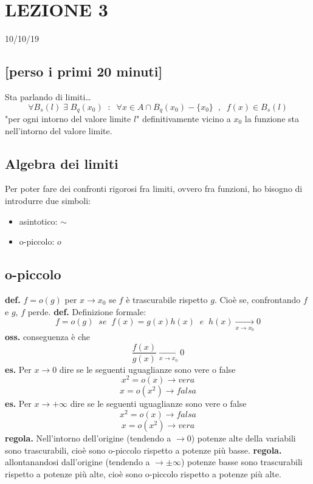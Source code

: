 \section*{LEZIONE 3}
10/10/19
\subsection*{[perso i primi 20 minuti]}
Sta parlando di limiti\dots
\newline
\[
    \forall B_s(l) \;\exists\; B_q(x_0) \;\;:\;\; \forall x\in A \cap B_q(x_0)-\{x_0\} \;\;,\;\;f(x) \in B_s(l)
\]
"per ogni intorno del valore limite $l$" definitivamente vicino a $x_0$ la funzione sta nell'intorno del valore limite.
\subsection*{Algebra dei limiti}
Per poter fare dei confronti rigorosi fra limiti, ovvero fra funzioni, ho bisogno di introdurre due simboli:
\begin{itemize}
    \item asintotico: $\sim$
    \item o-piccolo: $o$
\end{itemize}
\subsection*{o-piccolo}
\textbf{def.} $f = o(g)$ per $x \rightarrow x_0$ se $f$ è trascurabile rispetto $g$. Cioè se, confrontando $f$ e $g$, $f$ perde.
\newline
\newline
\textbf{def.} Definizione formale:
\[
    f = o(g) \;\; se \;\; f(x) = g(x)h(x) \;\; e \;\; h(x) \xrightarrow[x\rightarrow x_0] \; 0
\]
\textbf{oss.} conseguenza è che
\[
    \frac{f(x)}{g(x)}\xrightarrow[x\rightarrow x_0] \; 0
\]
\newline
\textbf{es.} Per $x\longrightarrow 0$ dire se le seguenti uguaglianze sono vere o false
\[
    x^2 = o(x) \rightarrow vera
\]
\[
    x=o(x^2) \rightarrow falsa
\]
\textbf{es.} Per $x\longrightarrow +\infty$ dire se le seguenti uguaglianze sono vere o false
\[
    x^2 = o(x) \rightarrow  falsa
\]
\[
    x=o(x^2) \rightarrow  vera
\]
\newline
\textbf{regola.} Nell'intorno dell'origine (tendendo a $\rightarrow  0$) potenze alte della variabili sono trascurabili, cioè sono o-piccolo rispetto a potenze più basse.
\newline
\textbf{regola.} allontanandosi dall'origine (tendendo a $\rightarrow \pm \infty$)  potenze basse sono trascurabili rispetto a potenze più alte, cioè sono o-piccolo rispetto a potenze più alte.
\newline
